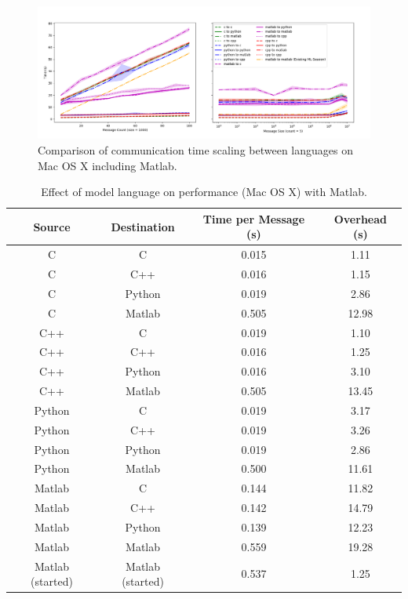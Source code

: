 \documentclass[journal]{IEEEtran}
\begin{document}
%
\ifinclfig
 	\begin{figure}[htbp]
	\begin{center}
	\includegraphics[width=\columnwidth,keepaspectratio]{./images/scaling_language_matlab.png}
	\caption{Comparison of communication time scaling between languages on Mac OS X including Matlab.}
	\label{fig:language_matlab}
	\end{center}
	\end{figure}
\fi
%
\begin{table}[htbp]
\begin{center}
\begin{tabular}{|c|c|c|c|}
\hline
Source 	& Destination 	& Time per Message (s) 	& Overhead (s) 	\\\hline
C 				& C					& 0.015				& 1.11			\\
C 				& C++				& 0.016				& 1.15			\\
C 				& Python				& 0.019				& 2.86			\\
C				& Matlab				& 0.505				& 12.98			\\
\hline%
C++ 				& C					& 0.019				& 1.10			\\
C++ 				& C++				& 0.016				& 1.25			\\
C++ 				& Python				& 0.016				& 3.10			\\
C++ 				& Matlab				& 0.505				& 13.45			\\
\hline%
Python			& C					& 0.019				& 3.17			\\
Python			& C++				& 0.019				& 3.26			\\
Python			& Python				& 0.019				& 2.86			\\
Python			& Matlab				& 0.500				& 11.61			\\
\hline%
Matlab			& C					& 0.144				& 11.82			\\
Matlab			& C++				& 0.142				& 14.79			\\
Matlab			& Python				& 0.139				& 12.23			\\
Matlab			& Matlab				& 0.559				& 19.28			\\
\hline%
Matlab (started)		& Matlab (started)		& 0.537				& 1.25			\\
\hline
\end{tabular}
\end{center}
\caption{Effect of model language on performance (Mac OS X) with Matlab.}
\label{tab:language_matlab}
\end{table}%
%
\end{document}
